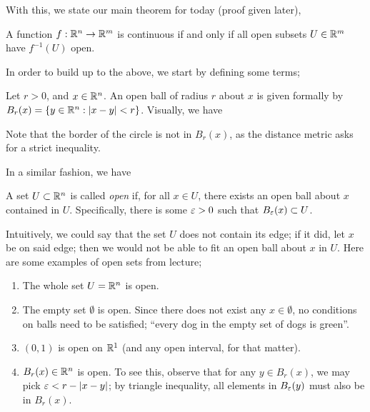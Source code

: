 \noindent With this, we state our main theorem for today (proof given later),

\begin{simplethm}
    A function $f : \mathbb R^n \to \mathbb R^m$ is continuous if and only if all open subsets $U \in \mathbb R^m$ have $f^{-1}(U)$ open.
\end{simplethm}

\noindent In order to build up to the above, we start by defining some terms;

\begin{definition}
    Let $r > 0$, and $x \in \mathbb R^n$. An open ball of radius $r$ about $x$ is given formally by $B_r(x) = \{y \in \mathbb R^n : \left\lvert x - y \right\rvert < r\}$. Visually, we have
    \begin{center}  \end{center}
    Note that the border of the circle is not in $B_r(x)$, as the distance metric asks for a strict inequality.
\end{definition}

\newpage
\noindent In a similar fashion, we have

\begin{definition}
    A set $U \subset \mathbb R^n$ is called \textit{open} if, for all $x \in U$, there exists an open ball about $x$ contained in $U$. Specifically, there is some $\varepsilon > 0$ such that $B_\varepsilon(x) \subset U$.
\end{definition}

\noindent Intuitively, we could say that the set $U$ does not contain its edge; if it did, let $x$ be on said edge; then we would not be able to fit an open ball about $x$ in $U$. Here are some examples of open sets from lecture;
\begin{enumerate}
    \item The whole set $U = \mathbb R^n$ is open.
    \item The empty set $\emptyset$ is open. Since there does not exist any $x \in \emptyset$, no conditions on balls need to be satisfied; ``every dog in the empty set of dogs is green''.
    \item $(0, 1)$ is open on $\mathbb R^1$ (and any open interval, for that matter).
    \item $B_r(x) \in \mathbb R^n$ is open. To see this, observe that for any $y \in B_r(x)$, we may pick $\varepsilon < r - \left\lvert x - y \right\rvert$; by triangle inequality, all elements in $B_\varepsilon(y)$ must also be in $B_r(x)$.
\end{enumerate}

